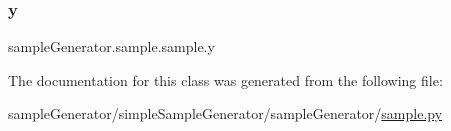 \subsubsection{\texorpdfstring{y}{y}}
{\footnotesize\ttfamily sample\+Generator.\+sample.\+sample.\+y}



The documentation for this class was generated from the following file\+:\begin{DoxyCompactItemize}
\item 
sample\+Generator/simple\+Sample\+Generator/sample\+Generator/\hyperlink{sample_8py}{sample.\+py}\end{DoxyCompactItemize}
